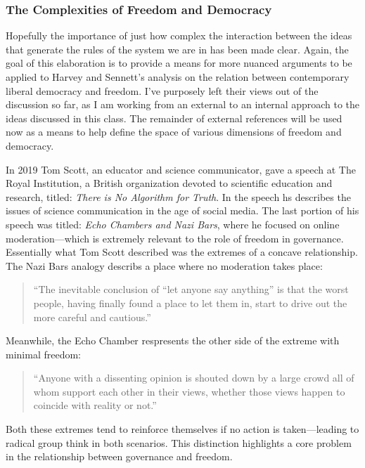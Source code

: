 \documentclass[12pt,a4paper]{article}
\begin{document}
\subsubsection{The Complexities of Freedom and Democracy}
\vspace*{-8pt}

Hopefully the importance of just how complex the interaction between the ideas that generate the rules of the system we are in has been made clear. Again, the goal of this elaboration is to provide a means for more nuanced arguments to be applied to Harvey and Sennett's analysis on the relation between contemporary liberal democracy and freedom. I've purposely left their views out of the discussion so far, as I am working from an external to an internal approach to the ideas discussed in this class. The remainder of external references will be used now as a means to help define the space of various dimensions of freedom and democracy.

In 2019 Tom Scott, an educator and science communicator, gave a speech at The Royal Institution, a British organization devoted to scientific education and research, titled: \textit{There is No Algorithm for Truth}. In the speech hs describes the issues of science communication in the age of social media. The last portion of his speech was titled: \textit{Echo Chambers and Nazi Bars}, where he focused on online moderation---which is extremely relevant to the role of freedom in governance. Essentially what Tom Scott described was the extremes of a concave relationship. The Nazi Bars analogy describs a place where no moderation takes place:
\begin{quote}
   \color{G-Moon}``The inevitable conclusion of ``let anyone say anything'' is that the worst people, having finally found a place to let them in, start to drive out the more careful and cautious.''~\cite{tom}
\end{quote} 
Meanwhile, the Echo Chamber respresents the other side of the extreme with minimal freedom: 
\begin{quote}
   \color{G-Moon} ``Anyone with a dissenting opinion is shouted down by a large crowd all of whom support each other in their views, whether those views happen to coincide with reality or not.''~\cite{tom}
\end{quote}
Both these extremes tend to reinforce themselves if no action is taken---leading to radical group think in both scenarios. This distinction highlights a core problem in the relationship between governance and freedom. 
\end{document}
